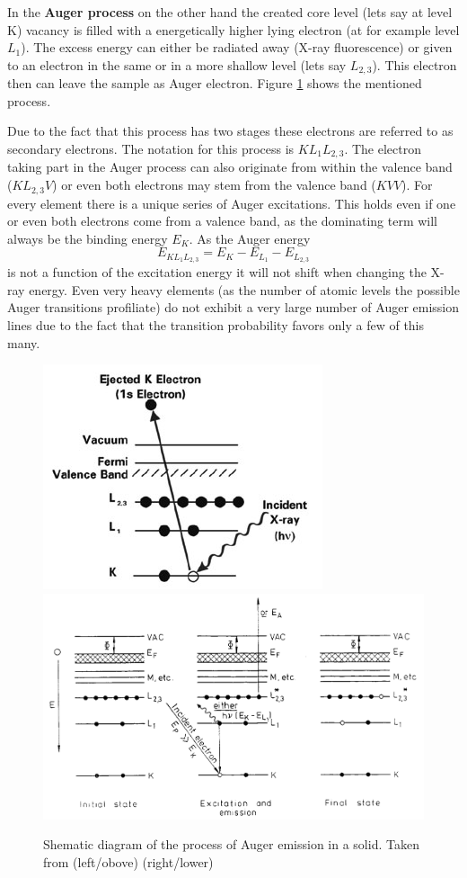  In the \textbf{Auger process}  on the other hand the created core level (lets say at level K) vacancy is filled with a energetically higher lying electron (at for example level $L_1$). The excess energy can either be radiated away (X-ray fluorescence) or given to an electron in the same or in a more shallow level (lets say $L_{2,3}$). This electron then can leave the sample as Auger electron. Figure \ref{fig:auger-core} shows the mentioned process. 
 
 Due to the fact that this process has two stages these electrons are referred to as secondary electrons. The notation for this process is $KL_1L_{2,3}$. The electron taking part in the Auger process can also originate from within the valence band ($KL_{2,3}V$) or even both electrons may stem from the valence band ($KVV$). For every element there is a unique series of Auger excitations. This holds even if one or even both electrons come from a valence band, as the dominating term will always be the binding energy $E_K$. As the Auger energy $$E_{KL_1L_{2,3}}=E_K-E_{L_1}-E_{L_{2,3}}$$ is not a function of the excitation energy it will not shift when changing the X-ray energy. Even very heavy elements (as the number of atomic levels the possible Auger transitions profiliate) do not exhibit a very large number of Auger emission lines due to the fact that the transition probability favors only a few of this many. \cite{Briggs_90}

\begin{figure}\centering
\includegraphics[height=0.3\textwidth]{./images/whatisxps-04.jpg}
\includegraphics[height=0.45\textwidth]{./images/auger.jpg}
\caption{Shematic diagram of the process of Auger emission in a solid. Taken from \cite{_whatisxps-04.jpg_2015}(left/obove) \cite{Briggs_90}(right/lower)}
\label{fig:auger-core}
\end{figure}

